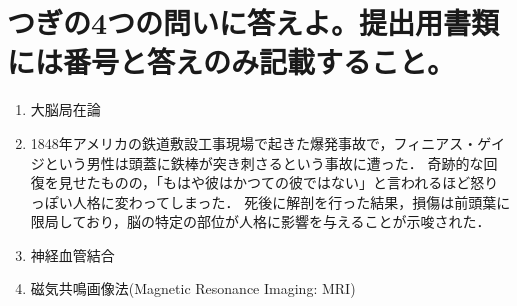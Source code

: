 \documentclass[titlepage,a4paper]{jsarticle}
\begin{document}
\section{つぎの4つの問いに答えよ。提出用書類には番号と答えのみ記載すること。}%
\begin{enumerate}
      \item 大脳局在論
      \item 1848年アメリカの鉄道敷設工事現場で起きた爆発事故で，フィニアス・ゲイジという男性は頭蓋に鉄棒が突き刺さるという事故に遭った．
            奇跡的な回復を見せたものの，「もはや彼はかつての彼ではない」と言われるほど怒りっぽい人格に変わってしまった．
            死後に解剖を行った結果，損傷は前頭葉に限局しており，脳の特定の部位が人格に影響を与えることが示唆された．
      \item 神経血管結合
      \item 磁気共鳴画像法(Magnetic Resonance Imaging: MRI)
\end{enumerate}
\end{document}
